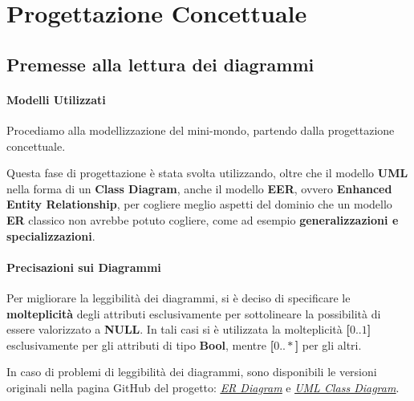 \chapter{Progettazione Concettuale}

\section{Premesse alla lettura dei diagrammi}

\subsubsection{Modelli Utilizzati}

Procediamo alla modellizzazione del mini-mondo, partendo dalla progettazione concettuale.

Questa fase di progettazione è stata svolta utilizzando, oltre che il modello \textbf{UML} nella forma di un \textbf{Class Diagram}, anche il modello \textbf{EER}, ovvero \textbf{Enhanced Entity Relationship}, per cogliere meglio aspetti del dominio che un modello \textbf{ER} classico non avrebbe potuto cogliere, come ad esempio \textbf{generalizzazioni e specializzazioni}.

\subsubsection{Precisazioni sui Diagrammi}

Per migliorare la leggibilità dei diagrammi, si è deciso di specificare le \textbf{molteplicità} degli attributi esclusivamente per sottolineare la possibilità di essere valorizzato a \textbf{NULL}. In tali casi si è utilizzata la molteplicità \textbf{[\(0..1\)]} esclusivamente per gli attributi di tipo \textbf{Bool}, mentre \textbf{[\(0..*\)]} per gli altri.

\bigskip

\begin{note}
  In caso di problemi di leggibilità dei diagrammi, sono disponibili le versioni originali nella pagina GitHub del progetto: \href{https://github.com/RiccardoElena/UninaDelivery/blob/develop/db/docs/sources/ER_Diagram.pdf}{\textit{\underline{ER Diagram}}} e \href{https://github.com/RiccardoElena/UninaDelivery/blob/develop/db/docs/sources/UML_Class_Diagram.pdf}{\textit{\underline{UML Class Diagram}}}.
\end{note}

\newpage


